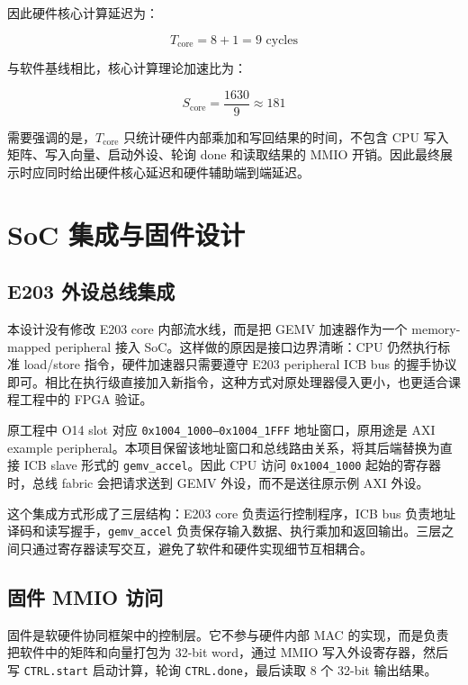 \documentclass[12pt, a4paper]{article}
\begin{document}
因此硬件核心计算延迟为：

\begin{equation}
    T_{\text{core}} = 8 + 1 = 9 \text{ cycles}
\end{equation}

与软件基线相比，核心计算理论加速比为：

\begin{equation}
    S_{\text{core}} = \frac{1630}{9} \approx 181
\end{equation}

需要强调的是，$T_{\text{core}}$ 只统计硬件内部乘加和写回结果的时间，不包含 CPU 写入矩阵、写入向量、启动外设、轮询 done 和读取结果的 MMIO 开销。因此最终展示时应同时给出硬件核心延迟和硬件辅助端到端延迟。

\section{SoC 集成与固件设计}

\subsection{E203 外设总线集成}

本设计没有修改 E203 core 内部流水线，而是把 GEMV 加速器作为一个 memory-mapped peripheral 接入 SoC。这样做的原因是接口边界清晰：CPU 仍然执行标准 load/store 指令，硬件加速器只需要遵守 E203 peripheral ICB bus 的握手协议即可。相比在执行级直接加入新指令，这种方式对原处理器侵入更小，也更适合课程工程中的 FPGA 验证。

原工程中 O14 slot 对应 \texttt{0x1004\_1000--0x1004\_1FFF} 地址窗口，原用途是 AXI example peripheral。本项目保留该地址窗口和总线路由关系，将其后端替换为直接 ICB slave 形式的 \texttt{gemv\_accel}。因此 CPU 访问 \texttt{0x1004\_1000} 起始的寄存器时，总线 fabric 会把请求送到 GEMV 外设，而不是送往原示例 AXI 外设。

这个集成方式形成了三层结构：E203 core 负责运行控制程序，ICB bus 负责地址译码和读写握手，\texttt{gemv\_accel} 负责保存输入数据、执行乘加和返回输出。三层之间只通过寄存器读写交互，避免了软件和硬件实现细节互相耦合。

\subsection{固件 MMIO 访问}

固件是软硬件协同框架中的控制层。它不参与硬件内部 MAC 的实现，而是负责把软件中的矩阵和向量打包为 32-bit word，通过 MMIO 写入外设寄存器，然后写 \texttt{CTRL.start} 启动计算，轮询 \texttt{CTRL.done}，最后读取 8 个 32-bit 输出结果。
\end{document}
